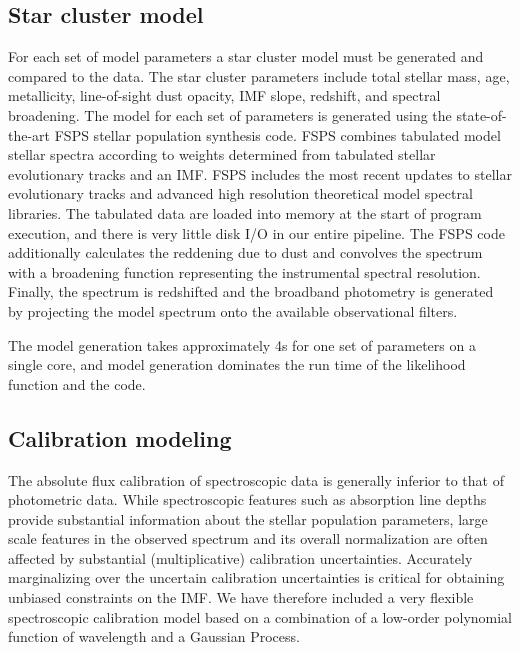 \documentclass[11pt,preprint]{aastex}
\begin{document}
\subsection{Star cluster model}
For each set of model parameters a star cluster model must be generated and compared to the data. 
The star cluster parameters include total stellar mass, age, metallicity, line-of-sight dust opacity, IMF slope, redshift, and spectral broadening.
The model for each set of parameters is generated using the state-of-the-art FSPS stellar population synthesis code.
FSPS combines tabulated model stellar spectra according to weights determined from tabulated stellar evolutionary tracks and an IMF.
FSPS includes the most recent updates to stellar evolutionary tracks and advanced high resolution theoretical model spectral libraries.
The tabulated data are loaded into memory at the start of program execution, and there is very little disk I/O in our entire pipeline.
The FSPS code additionally calculates the reddening due to dust and convolves the spectrum with a broadening function representing the instrumental spectral resolution.
Finally, the spectrum is redshifted and the broadband photometry is generated by projecting the model spectrum onto the available observational filters.

The model generation takes approximately 4s for one set of parameters on a single core, and model generation dominates the run time of the likelihood function and the code.

\subsection{Calibration modeling}
\label{sec:calibration}
The absolute flux calibration of spectroscopic data is generally inferior to that of photometric data.  
While spectroscopic features such as absorption line depths provide substantial information about the stellar population parameters, large scale features in the observed spectrum and its overall normalization are often affected by substantial (multiplicative) calibration uncertainties. 
Accurately marginalizing over the uncertain calibration uncertainties is critical for obtaining unbiased constraints on the IMF. 
We have therefore included a very flexible spectroscopic calibration model based on a combination of a low-order polynomial function of wavelength and a Gaussian Process.
\end{document}
